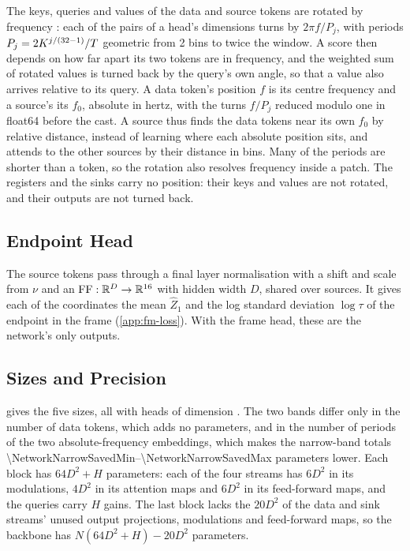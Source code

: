The keys, queries and values of the data and source tokens are rotated by frequency
\citep{su2024roformer,miyato2024gta}: each of the \NetworkRopePairs{} pairs of a head's dimensions
turns by $2\pi f/P_j$, with periods $P_j = 2K^{j/(32{}-1)}/T$ geometric from 2 bins
to twice the window. A score then depends on how far apart its two tokens are in frequency, and the
weighted sum of rotated values is turned back by the query's own angle, so that a value also
arrives relative to its query. A data token's position $f$ is its centre frequency and a source's
its $f_0$, absolute in hertz, with the turns $f/P_j$ reduced modulo one in float64 before the cast.
A source thus finds the data tokens near its own $f_0$ by relative distance, instead of learning
where each absolute position sits, and attends to the other sources by their distance in bins.
Many of the periods are shorter than a token, so the rotation also resolves frequency inside a
patch. The registers and the sinks carry no position: their keys and values are not rotated, and
their outputs are not turned back.

\subsection{Endpoint Head}
\label{app:network-head}

The source tokens pass through a final layer normalisation with a shift and scale from $\nu$ and an
$\mathrm{FF}:\mathbb{R}^D\to\mathbb{R}^{16{}}$ with hidden width $D$, shared over sources. It gives
each of the \NetworkCoords{} coordinates the mean $\hat Z_1$ and the log standard deviation
$\log\tau$ of the endpoint in the frame (\cref{app:fm-loss}). With the frame head, these are the
network's only outputs.

\subsection{Sizes and Precision}
\label{app:network-sizes}

 gives the five sizes, all with heads of dimension \NetworkHeadDim{}. The
two bands differ only in the number of data tokens, which adds no parameters, and in the number of
periods of the two absolute-frequency embeddings, which makes the narrow-band totals
\numrange{\NetworkNarrowSavedMin}{\NetworkNarrowSavedMax} parameters lower. Each block has $64D^2 +
H$ parameters: each of the four streams has $6D^2$ in its modulations, $4D^2$ in its attention maps
and $6D^2$ in its feed-forward maps, and the queries carry $H$ gains. The last block lacks the
$20D^2$ of the data and sink streams' unused output projections, modulations and feed-forward maps,
so the backbone has $N(64D^2 + H) - 20D^2$ parameters.

